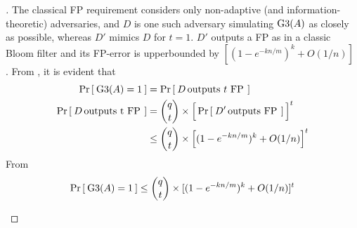 \begin{proof}[]
\noindent
The classical FP requirement considers only non-adaptive (and information-theoretic) adversaries, and $D$ is one such adversary simulating $\text{G3}(A)$ as closely as possible, whereas $D'$ mimics $D$ for $t=1$. $D'$ outputs a FP as in a classic Bloom filter and its FP-error is upperbounded by $[(1-e^{-kn/m})^k +O(1/n)]$ \cite{KirschMitzenmacher}.  %
From , it is evident that
\begin{align}
\Pr\left[\: \text{G3}(A)=1 \:\right] &= \Pr\left[\: D \, \mbox{outputs $t$ FP} \, \:\right]\label{eq:4a}\\
\nonumber \Pr\left[\: D \, \mbox{outputs t FP} \, \:\right] &= \dbinom{q}{t}\times \Big[\Pr\left[\: D' \, \mbox{outputs FP} \, \:\right]\Big]^t\\
& \leq \dbinom{q}{t}\times \Big[(1-e^{-kn/m})^k +O(1/n)\Big]^t \label{eq:4b}
\end{align}
From 
\begin{equation}
\Pr\left[\: \text{G3}(A)=1 \:\right] \leq \dbinom{q}{t}\times [(1-e^{-kn/m})^k +O(1/n)]^t \label{eq:4}
\end{equation}
\begin{figure}
\centering
{}
\end{figure}
\end{proof}
